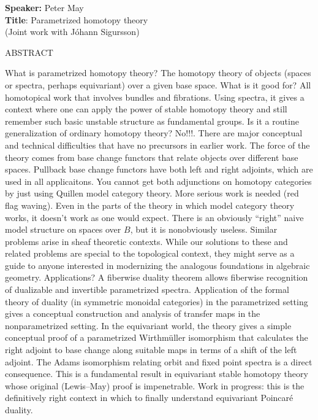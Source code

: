 \message{ !name(abstractMar15.tex)}\documentclass[12pt]{amsart}
\begin{document}

\noindent \textbf{Speaker:} Peter May \\
\textbf{Title}: Parametrized homotopy theory \\
\indent \indent \indent (Joint work with J\'ohann Sigur{\dh}sson)

\medskip

\begin{center} ABSTRACT \end{center}
  What is parametrized homotopy theory?  The
homotopy theory of objects (spaces or spectra, perhaps
equivariant)  over a given base space.  What is it good for? All
homotopical work that involves bundles and fibrations. Using
spectra, it gives a context where one can apply the power of
stable homotopy theory and still remember such basic unstable
structure as fundamental groups.  Is it a routine generalization
of ordinary homotopy theory? No!!!. There are major conceptual and
technical difficulties that have no precursors in earlier work.
 The force of the theory
comes  from base change functors that relate objects over
different  base spaces. Pullback base change functors have both
left and  right adjoints, which are used in all applicaitons. You
cannot  get both adjunctions on homotopy categories by just using
Quillen model category theory. More serious work is needed (red
flag waving).
  Even in the parts  of the theory in which model category theory works, it doesn't work as
one would expect. There is an obviously ``right'' naive model
 structure on spaces over $B$, but it is nonobviously useless.
  Similar problems arise in sheaf theoretic contexts.
 While  our
solutions to these and related problems are special to the
topological context, they might serve as a guide to anyone
interested in modernizing the analogous foundations in algebraic
geometry.  Applications?  A fiberwise duality  theorem allows
fiberwise recognition of dualizable  and invertible parametrized
spectra.  Application of the  formal theory of duality (in
symmetric monoidal categories) in the parametrized setting gives a
conceptual construction and analysis of transfer maps in the
nonparametrized setting.  In the equivariant world, the theory
gives a simple conceptual proof  of a parametrized Wirthm\"uller
isomorphism that calculates the right adjoint to base change along
suitable maps in terms of a shift of the left adjoint.
 The Adams isomorphism relating orbit and fixed  point
spectra is a direct consequence. This is a fundamental result in
equivariant stable homotopy theory whose original (Lewis--May)
proof is impenetrable.  Work in progress: this is the definitively
right context in which to finally understand equivariant
Poincar\'e duality.
\end{document}
